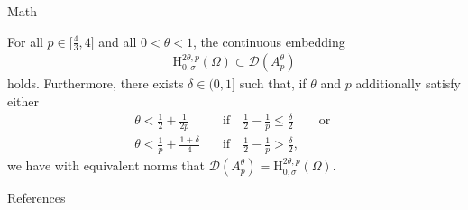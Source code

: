 \documentclass[english,institute=none]{tuhh_presentation}
\begin{document}
\begin{frame}{Math}
    \begin{theorem}
        For all $p \in \big[\frac{4}{3}, 4\big]$ and all $0 < \theta < 1$, the continuous embedding
        \begin{align*}
            \mathrm{H}^{2 \theta , p}_{0 , \sigma} (\Omega) \subset \mathcal{D}(A_p^{\theta})
        \end{align*}
        holds.
        Furthermore, there exists $\delta \in (0 , 1]$ such that, if $\theta$ and $p$ additionally satisfy either
        \begin{align*}
            \theta < \frac{1}{2} + \frac{1}{2 p} \quad &\text{if} \quad \frac{1}{2} - \frac{1}{p} \leq \frac{\delta}{2} \qquad\text{or } \\
            \theta < \frac{1}{p} + \frac{1 + \delta}{4} \quad &\text{if} \quad \frac{1}{2} - \frac{1}{p} > \frac{\delta}{2},
        \end{align*}
        we have with equivalent norms that $\mathcal{D}(A_p^{\theta}) = \mathrm{H}^{2 \theta , p}_{0 , \sigma} (\Omega).$
    \end{theorem}
\end{frame}

\finalpage

\begin{frame}{References}
    \printbibliography
\end{frame}
\end{document}
